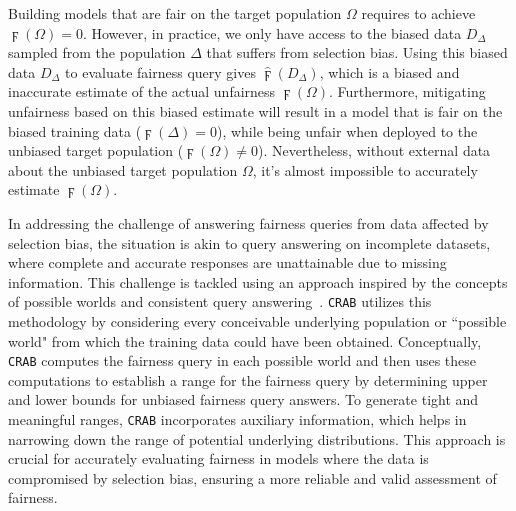 \documentclass[11pt]{article}
\newcommand{\seCondDemoParityDist}[1]{\hat{\digamma}(#1)}
\newcommand{\sCondDemoParityDist}[1]{\digamma(#1)}
\begin{document}
{Building models that are fair on the target population $\Omega$ requires to achieve $\sCondDemoParityDist{\Omega}=0$. However, in practice, we only have access to the biased data $D_\Delta$ sampled from the population $\Delta$ that suffers from selection bias. 
Using this biased data $D_\Delta$ to evaluate fairness query gives $\seCondDemoParityDist{D_\Delta}$, which is a biased and inaccurate estimate of the actual unfairness $\sCondDemoParityDist{\Omega}$. 
Furthermore, mitigating unfairness based on this biased estimate will result in a model that is fair on the biased training data ($\sCondDemoParityDist{\Delta}=0$), while being unfair when deployed to the unbiased target population ($\sCondDemoParityDist{\Omega}\neq0$).
Nevertheless, without external data about the unbiased target population $\Omega$, it's almost impossible to accurately estimate $\sCondDemoParityDist{\Omega}$. 

In addressing the challenge of answering fairness queries from data affected by selection bias, the situation is akin to query answering on incomplete datasets, where complete and accurate responses are unattainable due to missing information. This challenge is tackled using an approach inspired by the concepts of possible worlds and consistent query answering~\cite{console2020coping,fan2012foundations,feng2021efficient,koutris2018consistent}. \texttt{CRAB} utilizes this methodology by considering every conceivable underlying population or ``possible world" from which the training data could have been obtained. Conceptually, \texttt{CRAB} computes the fairness query in each possible world and then uses these computations to establish a range for the fairness query by determining upper and lower bounds for unbiased fairness query answers. To generate tight and meaningful ranges, \texttt{CRAB} incorporates auxiliary information, which helps in narrowing down the range of potential underlying distributions. This approach is crucial for accurately evaluating fairness in models where the data is compromised by selection bias, ensuring a more reliable and valid assessment of fairness.


\vspace{-.3cm}
}
\end{document}
